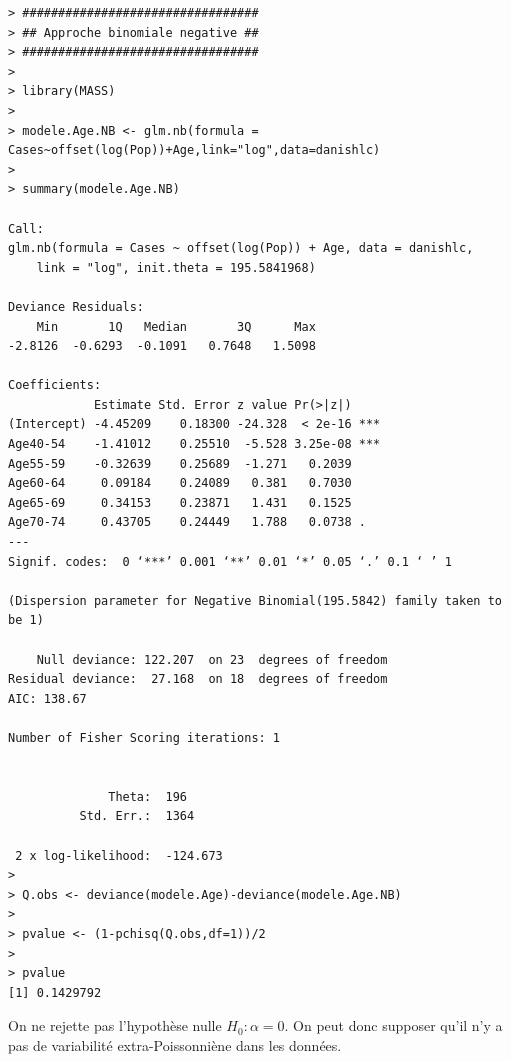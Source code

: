 \documentclass[11pt]{article}
\begin{document}
\begin{verbatim}
> #################################
> ## Approche binomiale negative ##
> #################################
> 
> library(MASS)
> 
> modele.Age.NB <- glm.nb(formula = Cases~offset(log(Pop))+Age,link="log",data=danishlc)
> 
> summary(modele.Age.NB)

Call:
glm.nb(formula = Cases ~ offset(log(Pop)) + Age, data = danishlc, 
    link = "log", init.theta = 195.5841968)

Deviance Residuals: 
    Min       1Q   Median       3Q      Max  
-2.8126  -0.6293  -0.1091   0.7648   1.5098  

Coefficients:
            Estimate Std. Error z value Pr(>|z|)    
(Intercept) -4.45209    0.18300 -24.328  < 2e-16 ***
Age40-54    -1.41012    0.25510  -5.528 3.25e-08 ***
Age55-59    -0.32639    0.25689  -1.271   0.2039    
Age60-64     0.09184    0.24089   0.381   0.7030    
Age65-69     0.34153    0.23871   1.431   0.1525    
Age70-74     0.43705    0.24449   1.788   0.0738 .  
---
Signif. codes:  0 ‘***’ 0.001 ‘**’ 0.01 ‘*’ 0.05 ‘.’ 0.1 ‘ ’ 1

(Dispersion parameter for Negative Binomial(195.5842) family taken to be 1)

    Null deviance: 122.207  on 23  degrees of freedom
Residual deviance:  27.168  on 18  degrees of freedom
AIC: 138.67

Number of Fisher Scoring iterations: 1


              Theta:  196 
          Std. Err.:  1364 

 2 x log-likelihood:  -124.673 
> 
> Q.obs <- deviance(modele.Age)-deviance(modele.Age.NB)
> 
> pvalue <- (1-pchisq(Q.obs,df=1))/2 
> 
> pvalue
[1] 0.1429792
\end{verbatim}

\noindent On ne rejette pas l'hypoth\`ese nulle $H_0:\alpha=0$. On peut donc supposer qu'il n'y a pas de variabilit\'e extra-Poissonni\`ene dans les donn\'ees.
\end{document}
